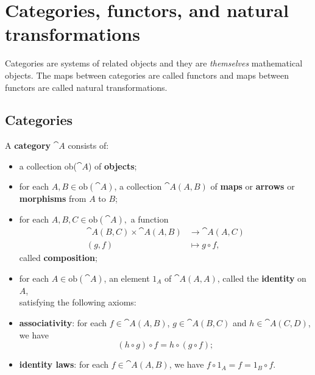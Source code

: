 \section{Categories, functors, and natural transformations}
Categories are systems of related objects and they are \textit{themselves} mathematical objects. The maps between categories are called functors and maps between functors are called natural transformations.

\subsection{Categories}

\begin{definition}
    A \textbf{category} $\cat{A}$ consists of:
\end{definition}
\begin{itemize}
    \item a collection ob($\cat{A}$) of \textbf{objects};
    \item for each $A,B \in \text{ob}(\cat{A})$, a collection $\cat{A}(A,B)$ of \textbf{maps} or \textbf{arrows} or \textbf{morphisms} from $A$ to $B$;
    \item for each $A,B,C\in \text{ob}(\cat{A}),$ a function
        \begin{align*}
            \cat{A}(B,C)\times \cat{A}(A,B) &\to \cat{A}(A,C) \\
            (g,f) &\mapsto g\circ f,
        \end{align*}
        called \textbf{composition};
    \item for each $A\in \text{ob}(\cat{A})$, an element $1_{A}$ of $\cat{A}(A, A)$, called the \textbf{identity} on $A$,\vspace{5mm} \\
        satisfying the following axioms:
    \item \textbf{associativity}: for each $f\in \cat{A}(A,B)$, $g\in \cat{A}(B,C)$ and $h\in \cat{A}(C,D)$, we have $$(h\circ g)\circ f=h\circ (g\circ f);$$
    \item \textbf{identity laws}: for each $f\in \cat{A}(A,B)$, we have $f\circ 1_{A}=f=1_{B}\circ f$.
\end{itemize}

